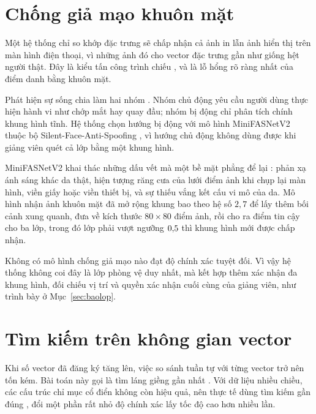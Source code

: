 \section{Chống giả mạo khuôn mặt}
\label{sec:chonggiamao}

Một hệ thống chỉ so khớp đặc trưng sẽ chấp nhận cả ảnh in lẫn ảnh hiển thị
trên màn hình điện thoại, vì những ảnh đó cho vector đặc trưng gần như giống
hệt người thật. Đây là kiểu tấn công trình chiếu  \cite{ISO30107, Ramachandra2017Survey},
và là lỗ hổng rõ ràng nhất của điểm danh bằng khuôn mặt.

Phát hiện sự sống  chia làm hai nhóm \cite{Ramachandra2017Survey}. Nhóm chủ động
yêu cầu người dùng thực hiện hành vi như chớp mắt hay quay đầu; nhóm bị động
chỉ phân tích chính khung hình tĩnh. Hệ thống chọn hướng bị động với mô hình
MiniFASNetV2 thuộc bộ Silent-Face-Anti-Spoofing \cite{Minivision2020Silent},
vì hướng chủ động không dùng được khi giảng viên quét cả lớp bằng một khung
hình.

MiniFASNetV2 khai thác những dấu vết mà một bề mặt phẳng để lại \cite{Ramachandra2017Survey}: phản xạ ánh
sáng khác da thật, hiện tượng răng cưa của lưới điểm ảnh khi chụp lại màn
hình, viền giấy hoặc viền thiết bị, và sự thiếu vắng kết cấu vi mô của da.
Mô hình nhận ảnh khuôn mặt đã mở rộng khung bao theo hệ số $2{,}7$ để lấy
thêm bối cảnh xung quanh, đưa về kích thước $80 \times 80$ điểm ảnh, rồi cho
ra điểm tin cậy cho ba lớp, trong đó lớp  phải vượt ngưỡng
$0{,}5$ thì khung hình mới được chấp nhận.

\begin{luuy}
Không có mô hình chống giả mạo nào đạt độ chính xác tuyệt đối. Vì vậy hệ
thống không coi đây là lớp phòng vệ duy nhất, mà kết hợp thêm xác nhận đa
khung hình, đối chiếu vị trí và quyền xác nhận cuối cùng của giảng viên, như
trình bày ở Mục~\ref{sec:baolop}.
\end{luuy}

\section{Tìm kiếm trên không gian vector}

Khi số vector đã đăng ký tăng lên, việc so sánh tuần tự với từng vector trở
nên tốn kém. Bài toán này gọi là tìm láng giềng gần nhất . Với dữ liệu nhiều chiều, các cấu trúc chỉ mục cổ điển
không còn hiệu quả, nên thực tế dùng tìm kiếm gần đúng \cite{Indyk1998ANN}, đổi một phần rất nhỏ
độ chính xác lấy tốc độ cao hơn nhiều lần.

